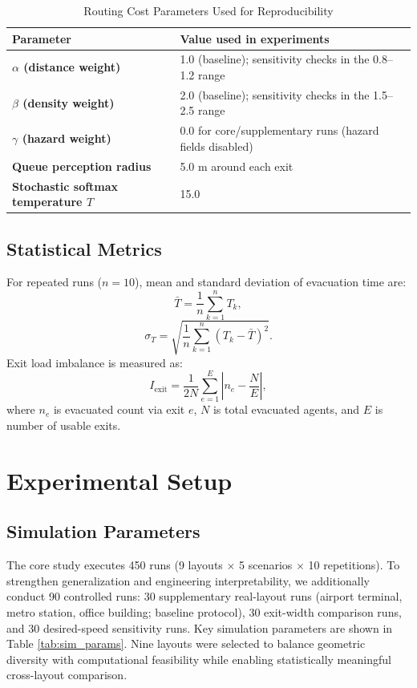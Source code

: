\documentclass[journal]{IEEEtran}
\begin{document}
\begin{table}[t]
\centering
\caption{Routing Cost Parameters Used for Reproducibility}
\label{tab:routing_params}
{\footnotesize
\setlength{\tabcolsep}{3pt}
\begin{tabular}{>{\bfseries}p{2.0cm} p{4.8cm}}
\toprule
Parameter & Value used in experiments \\
\midrule
$\alpha$ (distance weight) & 1.0 (baseline); sensitivity checks in the 0.8--1.2 range \\
$\beta$ (density weight) & 2.0 (baseline); sensitivity checks in the 1.5--2.5 range \\
$\gamma$ (hazard weight) & 0.0 for core/supplementary runs (hazard fields disabled) \\
Queue perception radius & 5.0 m around each exit \\
Stochastic softmax temperature $T$ & 15.0 \\
\bottomrule
\end{tabular}
}
\end{table}

\subsection{Statistical Metrics}
For repeated runs ($n=10$), mean and standard deviation of evacuation time are:
\begin{equation}
    \bar{T}=\frac{1}{n}\sum_{k=1}^{n}T_k,
\end{equation}
\begin{equation}
    \sigma_T=\sqrt{\frac{1}{n}\sum_{k=1}^{n}(T_k-\bar{T})^2}.
\end{equation}
Exit load imbalance is measured as:
\begin{equation}
    I_{\mathrm{exit}}=\frac{1}{2N}\sum_{e=1}^{E}\left|n_e-\frac{N}{E}\right|,
\end{equation}
where $n_e$ is evacuated count via exit $e$, $N$ is total evacuated agents, and $E$ is number of usable exits.

\section{Experimental Setup}
\subsection{Simulation Parameters}
The core study executes 450 runs (9 layouts $\times$ 5 scenarios $\times$ 10 repetitions). To strengthen generalization and engineering interpretability, we additionally conduct 90 controlled runs: 30 supplementary real-layout runs (airport terminal, metro station, office building; baseline protocol), 30 exit-width comparison runs, and 30 desired-speed sensitivity runs. Key simulation parameters are shown in Table \ref{tab:sim_params}.
Nine layouts were selected to balance geometric diversity with computational feasibility while enabling statistically meaningful cross-layout comparison.
\end{document}
